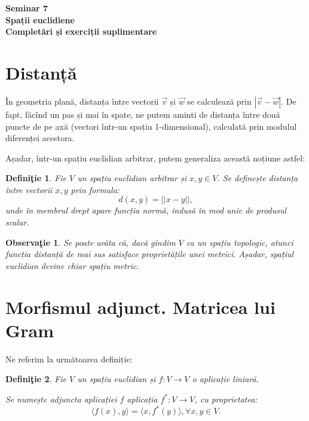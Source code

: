 \documentclass[11pt,a4paper]{article}
\theoremstyle{dotless}
\theoremstyle{dotlessdr}
\newtheorem{definition}{Defini\c{t}ie}[section]
\newtheorem{remark}{Observa\c{t}ie}[section]
\begin{document}
\begin{center}
  {\large\textbf{Seminar 7 \\
    Spații euclidiene\\ Completări și exerciții suplimentare}}
\end{center}

\vspace{1cm}


\section{Distanță}
\label{sec:distanta}

În geometria plană, distanța între vectorii $\vec{v}$ și $\vec{w}$ se calculează prin
$|\vec{v} - \vec{w}|$. De fapt, făcînd un pas și mai în spate, ne putem aminti de distanța
între două puncte de pe axă (vectori într-un spațiu 1-dimensional), calculată prin modulul
diferenței acestora.

Așadar, într-un spațiu euclidian arbitrar, putem generaliza această noțiune astfel:

\begin{definition}\label{def:dist}
  Fie $V$ un spațiu euclidian arbitrar și $x, y \in V$. Se definește \emph{distanța}
  între vectorii $x, y$ prin formula:
  \[
    d(x, y) = || x - y ||,
  \]
  unde în membrul drept apare funcția \emph{normă}, indusă în mod unic de produsul scalar.
\end{definition}

\begin{remark}\label{rk:dist-met}
  Se poate arăta că, dacă gîndim $V$ ca un spațiu topologic, atunci funcția distanță de mai sus
  satisface proprietățile unei \emph{metrici}. Așadar, spațiul euclidian devine chiar spațiu metric.
\end{remark}



\section{Morfismul adjunct. Matricea lui Gram}
\label{sec:adj-gram}

Ne referim la următoarea definiție:

\begin{definition}\label{def:adj}
  Fie $V$ un spațiu euclidian și $f : V \to V$ o aplicație liniară.

  Se numește \emph{adjuncta aplicației $f$} aplicația $f^\ast : V \to V$, cu proprietatea:
  \[
    \langle f(x), y \rangle = \langle x, f^\ast(y) \rangle, \forall x,y \in V.
  \]
\end{definition}
\end{document}
